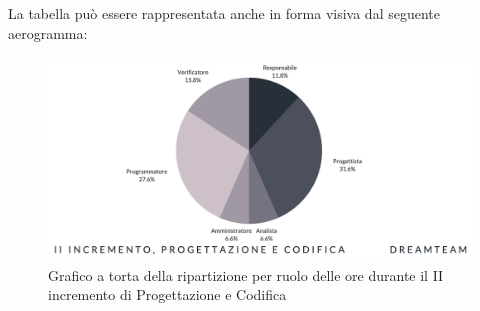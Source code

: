La tabella può essere rappresentata anche in forma visiva dal seguente aerogramma:
\begin{figure}[H]
\centering
\includegraphics[scale=0.55]{Sezioni/SezioniPreventivo/grafici/Preventivo_torta_progettazione_II.png}
\caption{Grafico a torta della ripartizione per ruolo delle ore durante il II incremento di Progettazione e Codifica}
\end{figure}

\pagebreak


